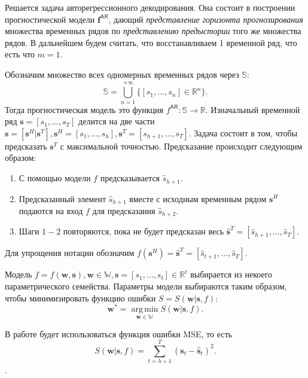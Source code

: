 \documentclass[12pt, twoside]{article}
\DeclareMathOperator*{\argmin}{arg\,min}
\begin{document}
\begin{comment}
\end{comment}

Решается задача авторегрессионного декодирования. Она состоит в построении прогностической модели $\mathbf{f}^{\mathsf{AR}}$, дающий \textit{представление горизонта прогнозирования} множества временных рядов по \textit{представлению предыстории} того же множества рядов. В дальнейшем будем считать, что восстанавливаем 1 временной ряд, что есть что $m=1$.

Обозначим множество всех одномерных временных рядов через $\mathbb{S}$: \[\mathbb{S} = \bigcup\limits_{n=1}^{+\infty}\{[s_1, \dots, s_n] \in \mathbb{R}^{n}\}.\] Тогда прогностическая модель это функция $f^{\mathsf{AR}}: \mathbb{S} \to \mathbb{R}$. Изначальный временной ряд $\mathbf{s} = [s_1, \dots, s_T]$ делится на две части $\mathbf{s} = [\mathbf{s}^H|\mathbf{s}^T], \mathbf{s}^H = [s_1, \dots, s_h], \mathbf{s}^T = [s_{h+1}, \dots, s_T]$. Задача состоит в том, чтобы предсказать $\mathbf{s}^T$ с максимальной точностью. Предсказание происходит следующим образом:

\begin{enumerate}
    \item С помощью модели $f$ предсказывается $\hat{s}_{h+1}$.
    \item Предсказанный элемент $\hat{s}_{h+1}$ вместе с исходным временным рядом $\mathbf{s}^H$ подаются на вход $f$ для предсказания $\hat{s}_{h+2}$.
    \item Шаги $1-2$ повторяются, пока не будет предсказан весь $\hat{\mathbf{s}}^T=[\hat{s}_{h+1}, \dots, \hat{s}_{T}]$.
\end{enumerate}

Для упрощения нотации обозначим $f(\mathbf{s}^H)=\hat{\mathbf{s}}^T = [\hat{s}_{t+1}, \dots, \hat{s}_{T}]$.

Модель $f = f(\mathbf{w}, \mathbf{s}), \mathbf{w} \in \mathbb{W}, \mathbf{s}=[s_1, \dots, s_t]\in \mathbb{R}^t$ выбирается из некоего параметрического семейства.
Параметры модели выбираются таким образом, чтобы минимизировать функцию ошибки $S=S(\mathbf{w}|\mathbf{s},f)$:
$$
\mathbf{w^*} = \argmin\limits_{\mathbf{w} \in \mathbb{W}} S(\mathbf{w}|\mathbf{s},f).
$$


В работе будет использоваться функция ошибки MSE, то есть 
$$
S(\mathbf{w}|\mathbf{s},f) = \sum\limits_{t=h+1}^{T}(\mathbf{s}_t - \hat{\mathbf{s}}_t)^2.
$$.
\end{document}
